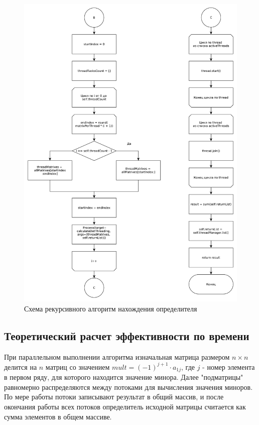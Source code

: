 \documentclass[a4paper,oneside,14pt]{extreport}
\begin{document}
\begin{figure}[H]
	\centering
	\includegraphics[width=0.90\linewidth]{images/solver_part_2}
	\caption{Схема рекурсивного алгоритм нахождения определителя}
	\label{img:solver_2}
\end{figure}

\subsection{Теоретический расчет эффективности по времени}

При параллельном выполнении алгоритма изначальная матрица размером $n \times n$ делится на $n$ матриц
со значением $mult = (-1)^{j + 1} \cdot a_{1j}$,
где $j$ - номер элемента в первом ряду, для которого находится значение минора.
Далее "подматрицы" равномерно распределяются между потоками для вычисления значения миноров.
По мере работы потоки записывают результат в общий массив, и после окончания работы всех потоков
определитель исходной матрицы считается как сумма элементов в общем массиве.
\end{document}

